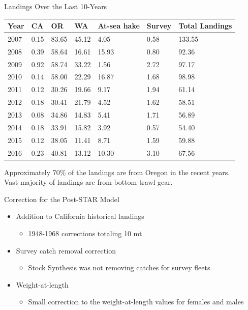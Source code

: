 \documentclass[pdf]{beamer}\usepackage[]{graphicx}\usepackage[]{color}
\begin{document}
\begin{frame}{Landings Over the Last 10-Years}
  \begin{table}[ht]
  \centering
  \begin{tabular}{p{0.4in}p{0.4in}p{0.4in}p{0.4in}p{0.4in}p{0.4in}p{0.6in}}
  Year & CA & OR & WA & At-sea hake & Survey & Total Landings \\ 
  \hline
  2007 & 0.15 & 83.65 & 45.12 & 4.05 & 0.58 & 133.55 \\ 
  2008 & 0.39 & 58.64 & 16.61 & 15.93 & 0.80 & 92.36 \\ 
  2009 & 0.92 & 58.74 & 33.22 & 1.56 & 2.72 & 97.17 \\ 
  2010 & 0.14 & 58.00 & 22.29 & 16.87 & 1.68 & 98.98 \\ 
  2011 & 0.12 & 30.26 & 19.66 & 9.17 & 1.94 & 61.14 \\ 
  2012 & 0.18 & 30.41 & 21.79 & 4.52 & 1.62 & 58.51 \\ 
  2013 & 0.08 & 34.86 & 14.83 & 5.41 & 1.71 & 56.89 \\ 
  2014 & 0.18 & 33.91 & 15.82 & 3.92 & 0.57 & 54.40 \\ 
  2015 & 0.12 & 38.05 & 11.41 & 8.71 & 1.59 & 59.88 \\ 
  2016 & 0.23 & 40.81 & 13.12 & 10.30 & 3.10 & 67.56 \\ 
  \hline
  \end{tabular}
  \end{table}
  Approximately 70\% of the landings are from Oregon in the recent years.\\
  Vast majority of landings are from bottom-trawl gear.
\end{frame}

\begin{frame}{Correction for the Post-STAR Model}
  \begin{itemize}
    \item Addition to California historical landings
      \begin{itemize}
        \item 1948-1968 corrections totaling 10 mt 
      \end{itemize}
    \item Survey catch removal correction
      \begin{itemize}
        \item Stock Synthesis was not removing catches for survey fleets
      \end{itemize}
    \item Weight-at-length
      \begin{itemize}
        \item Small correction to the weight-at-length values for females and males
      \end{itemize}    
  \end{itemize}
\end{frame}
\end{document}
